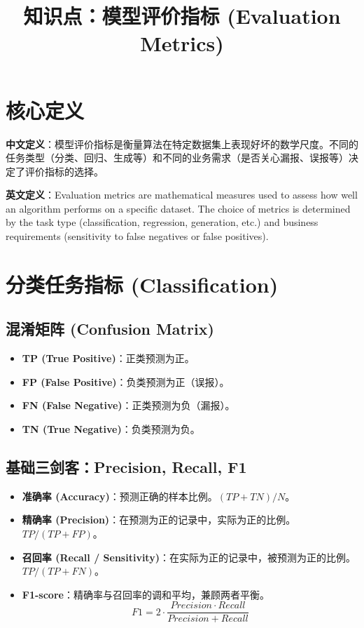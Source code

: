 \documentclass[12pt, a4paper]{article}
\title{知识点：模型评价指标 (Evaluation Metrics)}
\author{}
\date{}
\begin{document}
\maketitle

\section{核心定义}
\textbf{中文定义}：模型评价指标是衡量算法在特定数据集上表现好坏的数学尺度。不同的任务类型（分类、回归、生成等）和不同的业务需求（是否关心漏报、误报等）决定了评价指标的选择。

\textbf{英文定义}：Evaluation metrics are mathematical measures used to assess how well an algorithm performs on a specific dataset. The choice of metrics is determined by the task type (classification, regression, generation, etc.) and business requirements (sensitivity to false negatives or false positives).

\section{分类任务指标 (Classification)}

\subsection{混淆矩阵 (Confusion Matrix)}
\begin{itemize}
    \item \textbf{TP (True Positive)}：正类预测为正。
    \item \textbf{FP (False Positive)}：负类预测为正（误报）。
    \item \textbf{FN (False Negative)}：正类预测为负（漏报）。
    \item \textbf{TN (True Negative)}：负类预测为负。
\end{itemize}

\subsection{基础三剑客：Precision, Recall, F1}
\begin{itemize}
    \item \textbf{准确率 (Accuracy)}：预测正确的样本比例。$(TP+TN)/N$。
    \item \textbf{精确率 (Precision)}：在预测为正的记录中，实际为正的比例。$TP/(TP+FP)$。
    \item \textbf{召回率 (Recall / Sensitivity)}：在实际为正的记录中，被预测为正的比例。$TP/(TP+FN)$。
    \item \textbf{F1-score}：精确率与召回率的调和平均，兼顾两者平衡。
    $$ F1 = 2 \cdot \frac{Precision \cdot Recall}{Precision + Recall} $$
\end{itemize}
\end{document}
